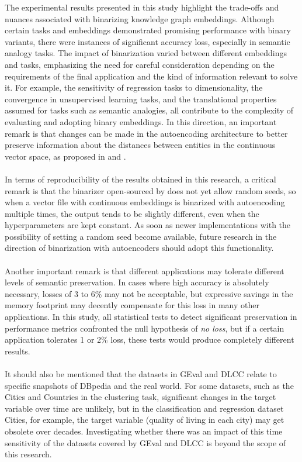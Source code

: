 \documentclass[11pt,titlepage,oneside,openany]{book}
\begin{document}
The experimental results presented in this study highlight the trade-offs and nuances associated with binarizing knowledge graph embeddings. Although certain tasks and embeddings demonstrated promising performance with binary variants, there were instances of significant accuracy loss, especially in semantic analogy tasks. The impact of binarization varied between different embeddings and tasks, emphasizing the need for careful consideration depending on the requirements of the final application and the kind of information relevant to solve it. For example, the sensitivity of regression tasks to dimensionality, the convergence in unsupervised learning tasks, and the translational properties assumed for tasks such as semantic analogies, all contribute to the complexity of evaluating and adopting binary embeddings. In this direction, an important remark is that changes can be made in the autoencoding architecture to better preserve information about the distances between entities in the continuous vector space, as proposed in \cite{navali_word_2020} and \cite{pan_relation_2021}.\\
\\
In terms of reproducibility of the results obtained in this research, a critical remark is that the binarizer open-sourced by \cite{tissier_near-lossless_2019} does not yet allow random seeds, so when a vector file with continuous embeddings is binarized with autoencoding multiple times, the output tends to be slightly different, even when the hyperparameters are kept constant. As soon as newer implementations with the possibility of setting a random seed become available, future research in the direction of binarization with autoencoders should adopt this functionality.\\
\\
Another important remark is that different applications may tolerate different levels of semantic preservation. In cases where high accuracy is absolutely necessary, losses of 3 to 6\% may not be acceptable, but expressive savings in the memory footprint may decently compensate for this loss in many other applications. In this study, all statistical tests to detect significant preservation in performance metrics confronted the null hypothesis of \textit{no loss}, but if a certain application tolerates 1 or 2\% loss, these tests would produce completely different results.\\
\\
It should also be mentioned that the datasets in GEval and DLCC relate to specific snapshots of DBpedia and the real world. For some datasets, such as the Cities and Countries in the clustering task, significant changes in the target variable over time are unlikely, but in the classification and regression dataset Cities, for example, the target variable (quality of living in each city) may get obsolete over decades. Investigating whether there was an impact of this time sensitivity of the datasets covered by GEval and DLCC is beyond the scope of this research.
\end{document}
